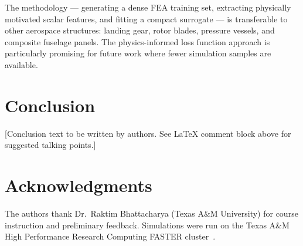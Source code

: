 \documentclass[10pt,letterpaper]{article}
\begin{document}
The methodology --- generating a dense FEA training set, extracting physically motivated
scalar features, and fitting a compact surrogate --- is transferable to other aerospace
structures: landing gear, rotor blades, pressure vessels, and composite fuselage panels.
The physics-informed loss function approach is particularly promising for future work where
fewer simulation samples are available.

\section{Conclusion}
[Conclusion text to be written by authors. See \LaTeX{} comment block above for suggested
talking points.]

\section*{Acknowledgments}

The authors thank Dr.~Raktim Bhattacharya (Texas A\&M University) for course instruction
and preliminary feedback. Simulations were run on the Texas A\&M High Performance Research
Computing FASTER cluster~\cite{hprc}.
\end{document}
